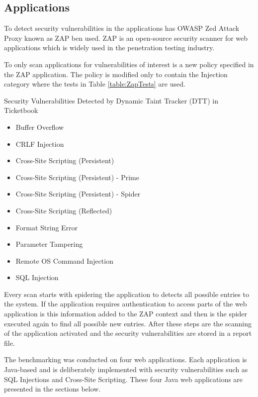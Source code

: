 \subsection{Applications}
To detect security vulnerabilities in the applications has OWASP Zed Attack Proxy \parencite{zap} known as ZAP ben used. ZAP is an open-source security scanner for web applications which is widely used in the penetration testing industry.

To only scan applications for vulnerabilities of interest is a new policy specified in the ZAP application. The policy is modified only to contain the Injection category where the tests in Table \ref{table:ZapTests} are used.

\begin{table}[!hbt]
  \centering
  \caption{Security Vulnerabilities Detected by Dynamic Taint Tracker (DTT) in Ticketbook}
    \label{table:ZapTests}
    \begin{itemize}
        \item Buffer Overflow
        \item CRLF Injection
        \item Cross-Site Scripting (Persistent)
        \item Cross-Site Scripting (Persistent) - Prime
        \item Cross-Site Scripting (Persistent) - Spider
        \item Cross-Site Scripting (Reflected)
        \item Format String Error
        \item Parameter Tampering
        \item Remote OS Command Injection
        \item SQL Injection
    \end{itemize}
\end{table}

Every scan starts with spidering the application to detects all possible entries to the system. If the application requires authentication to access parts of the web application is this information added to the ZAP context and then is the spider executed again to find all possible new entries. After these steps are the scanning of the application activated and the security vulnerabilities are stored in a report file. 

The benchmarking was conducted on four web applications. Each application is Java-based and is deliberately implemented with security vulnerabilities such as SQL Injections and Cross-Site Scripting. These four Java web applications are presented in the sections below.



